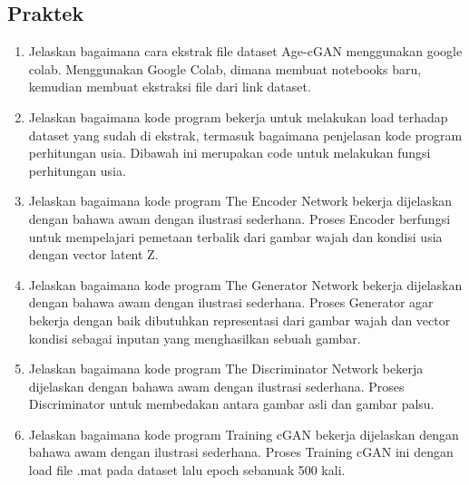 \subsection{Praktek}
\begin{enumerate}


	\item Jelaskan bagaimana cara ekstrak ﬁle dataset Age-cGAN menggunakan google colab.
Menggunakan Google Colab, dimana membuat notebooks baru, kemudian membuat ekstraksi file dari link dataset.

		

	\item Jelaskan bagaimana kode program bekerja untuk melakukan load terhadap dataset yang sudah di ekstrak, termasuk bagaimana penjelasan kode program perhitungan usia.
Dibawah ini merupakan code untuk melakukan fungsi perhitungan usia.

		

	\item Jelaskan bagaimana kode program The Encoder Network bekerja dijelaskan dengan bahawa awam dengan ilustrasi sederhana.
Proses Encoder berfungsi untuk mempelajari pemetaan terbalik dari gambar wajah dan kondisi usia dengan vector latent Z.

		

	\item Jelaskan bagaimana kode program The Generator Network bekerja dijelaskan dengan bahawa awam dengan ilustrasi sederhana.
Proses Generator agar bekerja dengan baik dibutuhkan representasi dari gambar wajah dan vector kondisi sebagai inputan yang menghasilkan sebuah gambar.

		

        	\item Jelaskan bagaimana kode program The Discriminator Network bekerja dijelaskan dengan bahawa awam dengan ilustrasi sederhana.
Proses Discriminator untuk membedakan antara gambar asli dan gambar palsu.

		

        	\item Jelaskan bagaimana kode program Training cGAN bekerja dijelaskan dengan bahawa awam dengan ilustrasi sederhana.
Proses Training cGAN ini dengan load file .mat pada dataset lalu epoch sebanuak 500 kali.


\end{enumerate}

